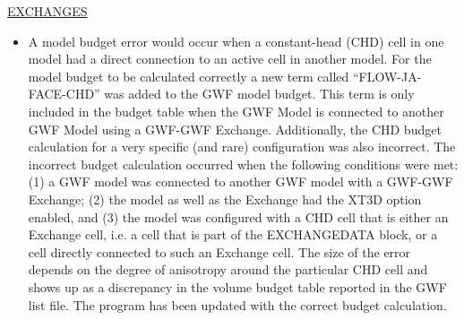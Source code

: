 	\underline{EXCHANGES}
	\begin{itemize}
		\item A model budget error would occur when a constant-head (CHD) cell in one model had a direct connection to an active cell in another model.  For the model budget to be calculated correctly a new term called ``FLOW-JA-FACE-CHD'' was added to the GWF model budget.  This term is only included in the budget table when the GWF Model is connected to another GWF Model using a GWF-GWF Exchange.  Additionally, the CHD budget calculation for a very specific (and rare) configuration was also incorrect. The incorrect budget calculation occurred when the following conditions were met: (1) a GWF model was connected to another GWF model with a GWF-GWF Exchange; (2) the model as well as the Exchange had the XT3D option enabled, and (3) the model was configured with a CHD cell that is either an Exchange cell, i.e. a cell that is part of the EXCHANGEDATA block, or a cell directly connected to such an Exchange cell.  The size of the error depends on the degree of anisotropy around the particular CHD cell and shows up as a discrepancy in the volume budget table reported in the GWF list file. The program has been updated with the correct budget calculation.
	\end{itemize}
